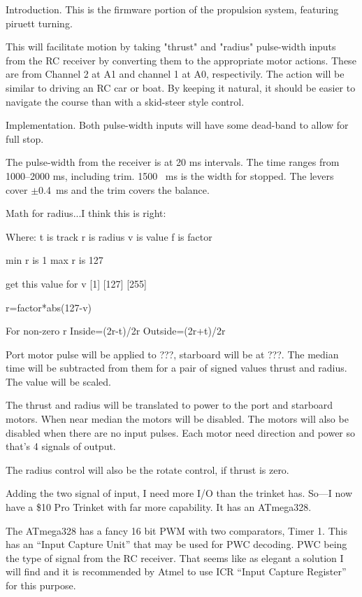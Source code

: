 


\nocon %
\datethis %


Introduction. This is the firmware portion of the propulsion system,
featuring piruett turning.

This will facilitate motion by taking "thrust" and "radius" pulse-width inputs
from the RC receiver by converting them to the appropriate motor actions.
These are from Channel 2 at A1 and channel 1 at A0, respectivily.
The action will be similar to driving an RC car or boat.
By keeping it natural, it should be easier to navigate the course than with a
skid-steer style control.

\fi

Implementation.
Both pulse-width inputs will have some dead-band to allow for full stop.

The pulse-width from the receiver is at 20 ms intervals.
The time ranges from 1000--2000 ms, including trim.
1500~ ms is the width for stopped.
The levers cover $\pm$0.4~ms and the trim
covers the balance.

Math for radius...I think this is right:

Where:
t is track
r is radius
v is value
f is factor

min r is 1
max r is 127

get this value for v
[1]
[127]
[255]

r=factor*abs(127-v)


For non-zero r
Inside=(2r-t)/2r
Outside=(2r+t)/2r


Port motor pulse will be applied to ???, starboard will be at ???.
The median time will be subtracted from them for a pair of signed values
thrust and radius. The value will be scaled.

The thrust and radius will be translated to power to the
port and starboard motors. When near median the motors will be disabled.
The motors will also be disabled when there are no input pulses.
Each motor need direction and power so that's 4 signals of output.

The radius control will also be the rotate control, if thrust is zero.

Adding the two signal of input, I need more I/O than the trinket has.
So---I now have a \$10 Pro Trinket with far more capability.
It has an ATmega328.

The ATmega328 has a fancy 16 bit PWM with two comparators, Timer 1.
This has an ``Input Capture Unit'' that may be used for PWC decoding.
PWC being the type of signal from the RC receiver.
That seems like as elegant a solution I will find and it is recommended by
Atmel to use ICR ``Input Capture Register'' for this purpose.

